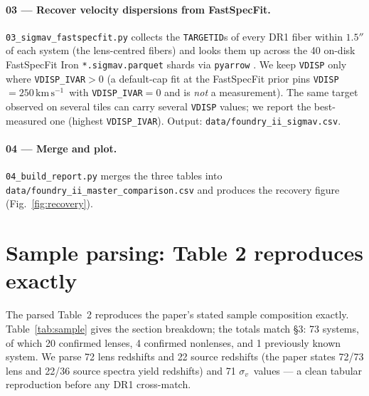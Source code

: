 \documentclass[11pt,letterpaper]{article}
\newcommand{\sigmav}{\ensuremath{\sigma_v}}
\newcommand{\kms}{\ensuremath{\mathrm{km\,s^{-1}}}}
\begin{document}
\paragraph{03 --- Recover velocity dispersions from FastSpecFit.}
\texttt{03\_sigmav\_fastspecfit.py} collects the \texttt{TARGETID}s of every DR1
fiber within $1.5''$ of each system (the lens-centred fibers) and looks them up
across the 40 on-disk FastSpecFit Iron \texttt{*.sigmav.parquet} shards via
\texttt{pyarrow} \autocite{pyarrow}. We keep \texttt{VDISP} only where
\texttt{VDISP\_IVAR}$>0$ (a default-cap fit at the FastSpecFit prior pins
\texttt{VDISP}$=250\,$\kms\ with \texttt{VDISP\_IVAR}$=0$ and is \emph{not} a
measurement). The same target observed on several tiles can carry several
\texttt{VDISP} values; we report the best-measured one (highest
\texttt{VDISP\_IVAR}). Output: \texttt{data/foundry\_ii\_sigmav.csv}.

\paragraph{04 --- Merge and plot.}
\texttt{04\_build\_report.py} merges the three tables into
\texttt{data/foundry\_ii\_master\_comparison.csv} and produces the recovery
figure (Fig.~\ref{fig:recovery}).

\section{Sample parsing: Table 2 reproduces exactly}

The parsed Table~2 reproduces the paper's stated sample composition exactly.
Table~\ref{tab:sample} gives the section breakdown; the totals match
\citet{huang2025foundry2} \S3: 73 systems, of which 20 confirmed lenses, 4
confirmed nonlenses, and 1 previously known system. We parse 72 lens redshifts
and 22 source redshifts (the paper states 72/73 lens and 22/36 source spectra
yield redshifts) and 71 \sigmav\ values --- a clean tabular reproduction before
any DR1 cross-match.
\end{document}
